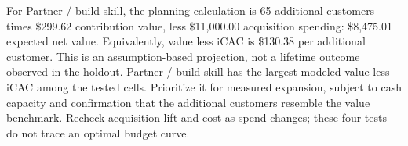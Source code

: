 \documentclass[10pt]{article}
\begin{document}
For Partner / build skill, the planning calculation is 65 additional customers times \$299.62 contribution value, less \$11,000.00 acquisition spending: \$8,475.01 expected net value. Equivalently, value less iCAC is \$130.38 per additional customer. This is an assumption-based projection, not a lifetime outcome observed in the holdout.
Partner / build skill has the largest modeled value less iCAC among the tested cells. Prioritize it for measured expansion, subject to cash capacity and confirmation that the additional customers resemble the value benchmark. Recheck acquisition lift and cost as spend changes; these four tests do not trace an optimal budget curve.
\end{document}
